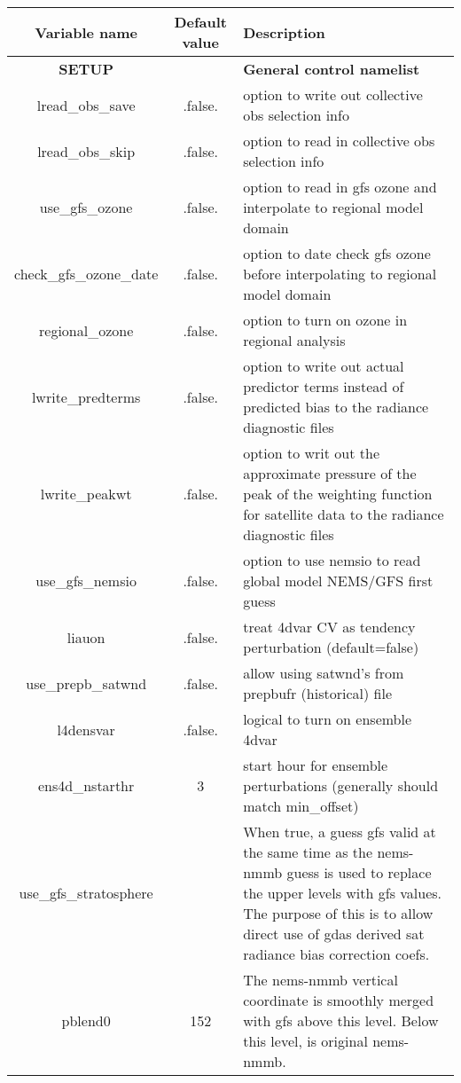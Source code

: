   
  \begin{table}[h]
 \footnotesize
 \center
 \begin{tabular}{| c | c | p{9cm} |}
 \hline
 Variable name & Default value & Description \\
 \hline
\textbf{SETUP} &   & \textbf{General control namelist} \\
 \hline
   lread\_obs\_save & .false.& option to write out collective obs selection info \\
  \hline
  lread\_obs\_skip & .false.& option to read in collective obs selection info \\
  \hline
  use\_gfs\_ozone & .false. & option to read in gfs ozone and interpolate to regional model domain \\
  \hline
  check\_gfs\_ozone\_date & .false. & option to date check gfs ozone before interpolating to regional model domain \\
  \hline
  regional\_ozone & .false. & option to turn on ozone in regional analysis \\
  \hline
  lwrite\_predterms & .false. & option to write out actual predictor terms instead of predicted bias to the radiance diagnostic files \\
  \hline
  lwrite\_peakwt & .false. & option to writ out the approximate pressure of the peak of the weighting function for satellite data to the radiance diagnostic files \\
  \hline
  use\_gfs\_nemsio & .false. & option to use nemsio to read global model NEMS/GFS first guess \\
  \hline
  liauon & .false. & treat 4dvar CV as tendency perturbation (default=false) \\
  \hline
  use\_prepb\_satwnd & .false. & allow using satwnd's from prepbufr (historical) file \\
  \hline
  l4densvar & .false. & logical to turn on ensemble 4dvar \\
  \hline
  ens4d\_nstarthr & 3 & start hour for ensemble perturbations (generally should match min\_offset) \\
  \hline
  use\_gfs\_stratosphere &  & When true, a guess gfs valid at the same time as the nems-nmmb guess is used to replace the upper levels with gfs values. The purpose of this is to allow direct use of gdas derived sat radiance bias correction coefs. \\
  \hline
  pblend0 & 152 & The nems-nmmb vertical coordinate is smoothly merged with gfs above this level. Below this level, is original nems-nmmb. \\

\end{tabular}
\end{table}
